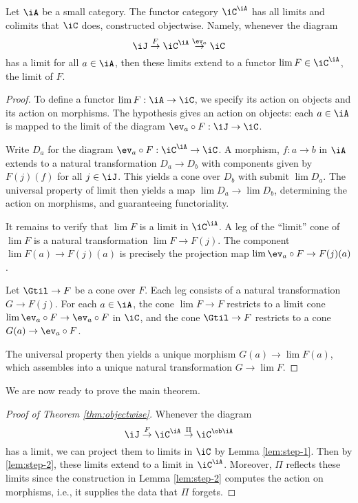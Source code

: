 \documentclass{amsart}
\begin{document}
\begin{lem}\label{lem:step-2}
  Let $\iA$ be a small category.
  The functor category $\iC^{\iA}$ has all limits and colimits that $\iC$ does, constructed objectwise.
  Namely, whenever the diagram
  \[
    \iJ \overset{F}{\to} \iC^{\iA} \overset{\ev_{a}}{\to} \iC
  \]
  has a limit for all $a \in \iA$, then these limits extend to a functor $\lim F \in \iC^{\iA}$, the limit of $F$.
\end{lem}
\begin{proof}
  To define a functor $\lim F : \iA \to \iC$, we specify its action on objects and its action on morphisms.
  The hypothesis gives an action on objects: each $a \in \iA$ is mapped to the limit of the diagram $\ev_{a} \circ F : \iJ \to \iC$.

  Write $D_{a}$ for the diagram $\ev_{a} \circ F : \iC^{\iA} \to \iC$.
  A morphism, $f : a \to b$ in $\iA$ extends to a natural transformation $D_{a} \to D_{b}$ with components given by $F(j)(f)$ for all $j \in \iJ$.
  This yields a cone over $D_{b}$ with submit $\lim D_{a}$.
  The universal property of limit then yields a map $\lim D_{a} \to \lim D_{b}$, determining the action on morphisms, and guaranteeing functoriality.

  It remains to verify that $\lim F$ is a limit in $\iC^{\iA}$.
  A leg of the ``limit'' cone of $\lim F$ is a natural transformation $\lim F \to F(j)$.
  The component $\lim F(a) \to F(j)(a)$ is precisely the projection map $\lim\ev_{a} \circ F \to F(j)(a)$.

  Let $\Gtil \to F$ be a cone over $F$.
  Each leg consists of a natural transformation $G \to F(j)$.
  For each $a \in \iA$, the cone $\lim F \to F$ restricts to a limit cone $\lim\ev_{a} \circ F \to \ev_{a} \circ F$ in $\iC$, and the cone $\Gtil \to F$ restricts to a cone $G(a) \to \ev_{a} \circ F$.
  
  
  The universal property then yields a unique morphism $G(a) \to \lim F(a)$, which assembles into a unique natural transformation $G \to \lim F$.
\end{proof}

We are now ready to prove the main theorem.
\begin{proof}[Proof of Theorem \ref{thm:objectwise}]
  Whenever the diagram
  \[
    \iJ \overset{F}{\to} \iC^{\iA} \overset{\Pi}{\to} \iC^{\ob \iA}
  \]
  has a limit, we can project them to limits in $\iC$ by Lemma \ref{lem:step-1}.
  Then by \ref{lem:step-2}, these limits extend to a limit in $\iC^{\iA}$.
  Moreover, $\Pi$ reflects these limits since the construction in Lemma \ref{lem:step-2} computes the action on morphisms, i.e., it supplies the data that $\Pi$ forgets.
\end{proof}



\end{document}
